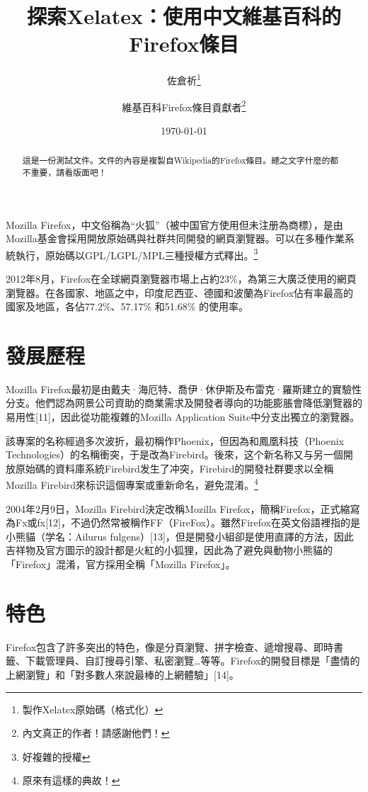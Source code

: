 \documentclass[12pt, a4paper, twoside]{article}
\begin{document}
\title{探索Xelatex：使用中文維基百科的Firefox條目}
\author{佐倉祈\thanks{製作Xelatex原始碼（格式化）}
  \and 維基百科Firefox條目貢獻者\thanks{內文真正的作者！請感謝他們！}}
\date{\today}
\maketitle

\begin{abstract}
這是一份測試文件。文件的內容是複製自Wikipedia的Firefox條目。總之文字什麼的都不重要，請看版面吧！
\end{abstract}

Mozilla Firefox，中文俗稱為“火狐”（被中国官方使用但未注册為商標），是由Mozilla基金會採用開放原始碼與社群共同開發的網頁瀏覽器。可以在多種作業系統執行，原始碼以GPL/LGPL/MPL三種授權方式釋出。\footnote{好複雜的授權}

2012年8月，Firefox在全球網頁瀏覽器市場上占約23\%，為第三大廣泛使用的網頁瀏覽器。在各國家、地區之中，印度尼西亚、德國和波蘭為Firefox佔有率最高的國家及地區，各佔77.2\%、57.17\% 和51.68\% 的使用率。

\section{發展歷程}
Mozilla Firefox最初是由戴夫·海厄特、喬伊·休伊斯及布雷克·羅斯建立的實驗性分支。他們認為网景公司資助的商業需求及開發者導向的功能膨脹會降低瀏覽器的易用性[11]，因此從功能複雜的Mozilla Application Suite中分支出獨立的瀏覽器。

該專案的名称經過多次波折，最初稱作Phoenix，但因為和鳳凰科技（Phoenix Technologies）的名稱衝突，于是改為Firebird。後來，这个新名称又与另一個開放原始碼的資料庫系統Firebird发生了冲突，Firebird的開發社群要求以全稱Mozilla Firebird來标识這個專案或重新命名，避免混淆。\footnote{原來有這樣的典故！}

2004年2月9日，Mozilla Firebird決定改稱Mozilla Firefox，簡稱Firefox，正式縮寫為Fx或fx[12]，不過仍然常被稱作FF（FireFox）。雖然Firefox在英文俗語裡指的是小熊貓（学名：Ailurus fulgens）[13]，但是開發小組卻是使用直譯的方法，因此吉祥物及官方圖示的設計都是火紅的小狐狸，因此為了避免與動物小熊貓的「Firefox」混淆，官方採用全稱「Mozilla Firefox」。

\section{特色}

Firefox包含了許多突出的特色，像是分頁瀏覽、拼字檢查、遞增搜尋、即時書籤、下載管理員、自訂搜尋引擎、私密瀏覽…等等。Firefox的開發目標是「盡情的上網瀏覽」和「對多數人來說最棒的上網體驗」[14]。
\end{document}
